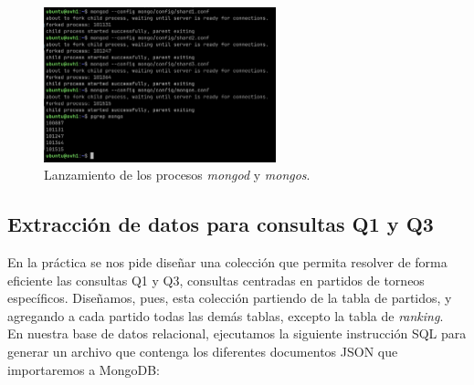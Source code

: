 \begin{figure}[H]
\centering
\includegraphics[width=0.6\textwidth]{fotos/mongo/lanzar_mongod.png}
\caption{Lanzamiento de los procesos \textit{mongod} y \textit{mongos}.}
\label{fig:lanzar_mongo}
\end{figure}


\subsection{Extracción de datos para consultas Q1 y Q3}

En la práctica se nos pide diseñar una colección que permita resolver de forma eficiente las consultas Q1 y Q3, consultas centradas en partidos de torneos específicos. Diseñamos, pues, esta colección partiendo de la tabla de partidos, y agregando a cada partido todas las demás tablas, excepto la tabla de \textit{ranking}. \\

En nuestra base de datos relacional, ejecutamos la siguiente instrucción SQL para generar un archivo que contenga los diferentes documentos JSON que importaremos a MongoDB:

